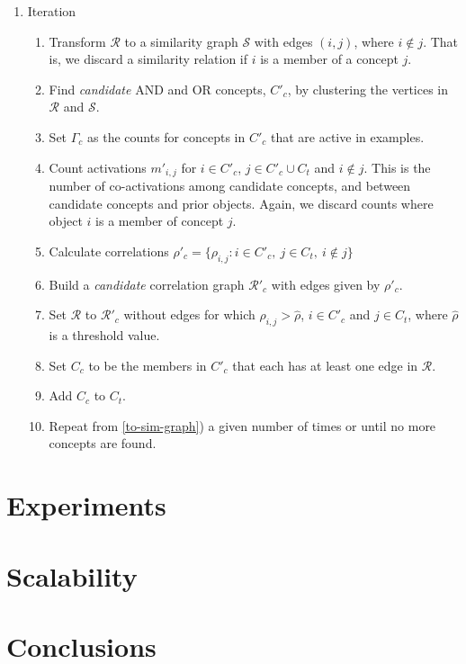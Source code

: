 \documentclass[conference]{IEEEtran}
\newcommand{\rn}[1]{\rho_{#1}}
\begin{document}
\begin{enumerate}
\item Iteration
\begin{enumerate}
\item
\label{to-sim-graph}
Transform $\mathcal{R}$ to a similarity graph $\mathcal{S}$ with edges $(i, j)$, where $i \not\in j$. That is,
we discard a similarity relation if $i$ is a member of a concept $j$.
\item
Find \emph{candidate} AND and OR concepts, $C'_c$, by clustering the vertices in $\mathcal{R}$ and $\mathcal{S}$.
\item
Set $\Gamma_c$ as the counts for concepts in $C'_c$ that are active in examples. 
\item
Count activations $m'_{i,j}$ for $i \in C'_c$, $j \in C'_c \cup C_t$ and $i \not\in j$. This is the number of co-activations
 among candidate concepts, and between candidate concepts and prior objects. Again, we discard counts where object $i$ is a member of concept $j$.
\item
Calculate correlations $\rho'_c  = \{\rn{i,j}: i \in C'_c,\ j \in C_t,\ i \not \in j\}$ 
\item
Build a \emph{candidate} correlation graph $\mathcal{R}'_c$ with edges given by $\rho'_c$.
\item
Set $\mathcal{R}$ to $\mathcal{R}'_c$ without edges for which $\rn{i,j} > \hat\rho$, $i \in C'_c$ and $j \in C_t$, where $\hat\rho$ is a threshold value.
\item
Set $C_c$ to be the members in $C'_c$ that each has at least one edge in $\mathcal{R}$.
\item
Add $C_c$ to $C_t$.
\item
Repeat from \ref{to-sim-graph}) a given number of times or until no more concepts are found.
\end{enumerate}

\end{enumerate}

\section{Experiments}
\label{sec:experiments}


\section{Scalability}
\label{sec: scalability}


\section{Conclusions}
\label{sec:conclusions}
\end{document}
